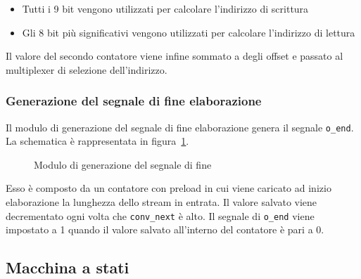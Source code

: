 \documentclass[a4paper,11pt]{article}
\begin{document}
\begin{itemize}
  \item Tutti i 9 bit vengono utilizzati per calcolare l'indirizzo di scrittura
  \item Gli 8 bit più significativi vengono utilizzati per calcolare l'indirizzo
    di lettura
\end{itemize}

Il valore del secondo contatore viene infine sommato a degli offset e passato al
multiplexer di selezione dell'indirizzo.

\subsubsection{Generazione del segnale di fine elaborazione}

Il modulo di generazione del segnale di fine elaborazione genera il segnale
\texttt{o\_end}. La schematica è rappresentata in
figura~\ref{fig:end-generation-rtl}.

\begin{figure}[htb]
  \centering
  \caption{Modulo di generazione del segnale di fine}%
  \label{fig:end-generation-rtl}
\end{figure}

Esso è composto da un contatore con preload in cui viene caricato ad inizio
elaborazione la lunghezza dello stream in entrata. Il valore salvato viene
decrementato ogni volta che \texttt{conv\_next} è alto. Il segnale di
\texttt{o\_end} viene impostato a 1 quando il valore salvato all'interno del
contatore è pari a 0.

\subsection{Macchina a stati}
\end{document}
